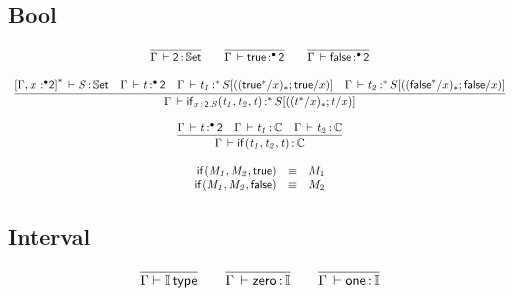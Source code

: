 \documentclass[11pt]{article}
\theoremstyle{plain}
\begin{document}
\subsection{Bool}

\[
\begin{array}{c}
\infer{\ofdtp{\Gamma}{\bool}{\types}}
      {}
\qquad
\infer{\oftpe{\Gamma}{\dsd{true}}{\bullet}{\bool}}{}
\qquad
\infer{\oftpe{\Gamma}{\dsd{false}}{\bullet}{\bool}}{}
\\ \\
\infer{\oftpe{\Gamma}{\ite{\tptm{x}{\dsd{2}}.S}{t_1}{t_2}{t}}{\vcond}{\tsubst{S}{\substdup{(t^\vcond/x)}{\vcond}{t/x}}}}
      {\ofdtp{\dupctx{\Gamma,\tpvar{x}{\bullet}{\dsd{2}}}{\vcond}}{S}{\types} &
        \oftpe{\Gamma}{t}{\bullet}{\dsd{2}} &
        \oftpe{\Gamma}{t_1}{\vcond}{\tsubst{S}{\substdup{(\dsd{true}^\vcond/x)}{\vcond}{\dsd{true}/x}}} &
        \oftpe{\Gamma}{t_2}{\vcond}{\tsubst{S}{\substdup{(\dsd{false}^\vcond/x)}{\vcond}{\dsd{false}/x}}}
      }
\\ \\
\infer{\oftp{\Gamma}{\ite{}{t_1}{t_2}{t}}{\C}}
      { \oftpe{\Gamma}{t}{\bullet}{\dsd{2}} &
        \ofdtp{\Gamma}{t_1}{\C} &
        \ofdtp{\Gamma}{t_2}{\C}
      }
\\ \\
\begin{array}{rcll}
\ite{}{M_1}{M_2}{\dsd{true}} & \equiv & M_1 \\
\ite{}{M_1}{M_2}{\dsd{false}} & \equiv & M_2 \\
\end{array} \\
\end{array}
\]

\subsection{Interval}

\[
\begin{array}{c}
\infer{\wftp{\Gamma}{\I}}
      {}
\qquad
\infer{\oftp{\Gamma}{\Iz}{\I}}{}
\qquad
\infer{\oftp{\Gamma}{\Io}{\I}}{}
\end{array}
\]
\end{document}
